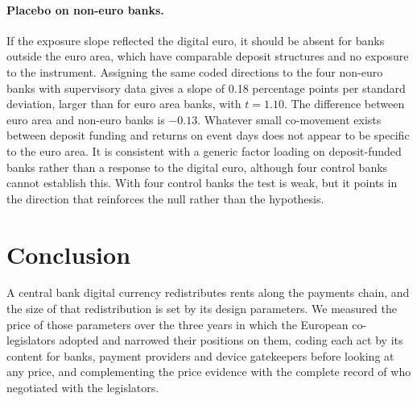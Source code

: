 \documentclass[11pt]{article}
\theoremstyle{plain}\newtheorem{proposition}{Proposition}
\begin{document}
\paragraph{Placebo on non-euro banks.} If the exposure slope reflected the digital euro, it should be absent for banks outside the euro area, which have comparable deposit structures and no exposure to the instrument. Assigning the same coded directions to the four non-euro banks with supervisory data gives a slope of 0.18 percentage points per standard deviation, larger than for euro area banks, with $t = 1.10$. The difference between euro area and non-euro banks is $-0.13$. Whatever small co-movement exists between deposit funding and returns on event days does not appear to be specific to the euro area. It is consistent with a generic factor loading on deposit-funded banks rather than a response to the digital euro, although four control banks cannot establish this. With four control banks the test is weak, but it points in the direction that reinforces the null rather than the hypothesis.


\section{Conclusion}

A central bank digital currency redistributes rents along the payments chain, and the size of that redistribution is set by its design parameters. We measured the price of those parameters over the three years in which the European co-legislators adopted and narrowed their positions on them, coding each act by its content for banks, payment providers and device gatekeepers before looking at any price, and complementing the price evidence with the complete record of who negotiated with the legislators.
\end{document}
